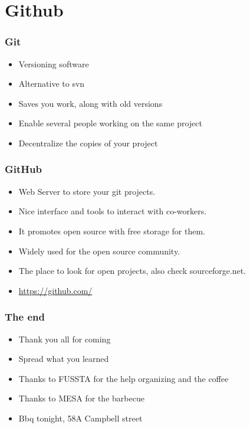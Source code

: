 \documentclass{beamer}
\begin{document}
\section{Github}
\begin{frame}
\frametitle{Git}
\begin{itemize}
\item Versioning software
\item Alternative to svn
\item Saves you work, along with old versions
\item Enable several people working on the same project
\item Decentralize the copies of your project
\end{itemize}
\end{frame}

\begin{frame}
\frametitle{GitHub}
\begin{itemize}
\item Web Server to store your git projects.
\item Nice interface and tools to interact with co-workers.
\item It promotes open source with free storage for them.
\item Widely used for the open source community.
\item The place to look for open projects, also check sourceforge.net.
\item \url{https://github.com/}
\end{itemize}
\end{frame}

\begin{frame}
\frametitle{The end}
\begin{itemize}
\item Thank you all for coming
\item Spread what you learned

\item Thanks to FUSSTA for the help organizing and the coffee
\item Thanks to MESA for the barbecue
\item Bbq tonight, 58A Campbell street
\end{itemize}
\end{frame}
\end{document}
